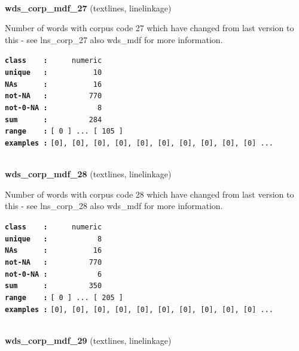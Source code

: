 \documentclass[]{article}
\begin{document}
~

\textbf{wds\_corp\_mdf\_27} (textlines, linelinkage)

Number of words with corpus code 27 which have changed from last version
to this - see lns\_corp\_27 also wds\_mdf for more information.

\textbf{\texttt{class\ \ \ \ :}} \texttt{~~~~~numeric}\\
\textbf{\texttt{unique\ \ \ :}} \texttt{~~~~~~~~~~10}\\
\textbf{\texttt{NAs\ \ \ \ \ \ :}} \texttt{~~~~~~~~~~16}\\
\textbf{\texttt{not-NA\ \ \ :}} \texttt{~~~~~~~~~770}\\
\textbf{\texttt{not-0-NA\ :}} \texttt{~~~~~~~~~~~8}\\
\textbf{\texttt{sum\ \ \ \ \ \ :}} \texttt{~~~~~~~~~284}\\
\textbf{\texttt{range\ \ \ \ :}}
\texttt{{[}\ 0\ {]}\ ...\ {[}\ 105\ {]}}\\
\textbf{\texttt{examples\ :}}
\texttt{{[}0{]},\ {[}0{]},\ {[}0{]},\ {[}0{]},\ {[}0{]},\ {[}0{]},\ {[}0{]},\ {[}0{]},\ {[}0{]},\ {[}0{]}\ ...}\\

~

\textbf{wds\_corp\_mdf\_28} (textlines, linelinkage)

Number of words with corpus code 28 which have changed from last version
to this - see lns\_corp\_28 also wds\_mdf for more information.

\textbf{\texttt{class\ \ \ \ :}} \texttt{~~~~~numeric}\\
\textbf{\texttt{unique\ \ \ :}} \texttt{~~~~~~~~~~~8}\\
\textbf{\texttt{NAs\ \ \ \ \ \ :}} \texttt{~~~~~~~~~~16}\\
\textbf{\texttt{not-NA\ \ \ :}} \texttt{~~~~~~~~~770}\\
\textbf{\texttt{not-0-NA\ :}} \texttt{~~~~~~~~~~~6}\\
\textbf{\texttt{sum\ \ \ \ \ \ :}} \texttt{~~~~~~~~~350}\\
\textbf{\texttt{range\ \ \ \ :}}
\texttt{{[}\ 0\ {]}\ ...\ {[}\ 205\ {]}}\\
\textbf{\texttt{examples\ :}}
\texttt{{[}0{]},\ {[}0{]},\ {[}0{]},\ {[}0{]},\ {[}0{]},\ {[}0{]},\ {[}0{]},\ {[}0{]},\ {[}0{]},\ {[}0{]}\ ...}\\

~

\textbf{wds\_corp\_mdf\_29} (textlines, linelinkage)
\end{document}
